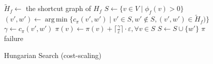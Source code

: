 \documentclass[11pt]{article}
\def\eps{\varepsilon}
\DeclareMathOperator*{\argmin}{arg\,min}
\def\fsupply{\phi}
\theoremstyle{plain}
\numberwithin{figure}{section}
\begin{document}
\begin{figure*}
\centering
\begin{minipage}{.8\linewidth}
\begin{algorithm}[H]
\caption{Hungarian Search (cost-scaling)}
\begin{algorithmic}[1]
	\State $\tilde{H}_f \gets$ the shortcut graph of $H_f$
	\State $S \gets \{v \in V \mid \fsupply_f(v) > 0\}$
	\Repeat
		\State $(v', w') \gets \argmin\{c_\pi(v', w') \mid v' \in S, w' \not\in S, (v', w') \in \tilde{H}_f)\}$
			\label{line:hs_relaxation}
		\State $\gamma \gets c_\pi(v', w')$
			\State $\pi(v) \gets \pi(v) + \lceil\frac{\gamma}{\eps}\rceil\cdot \eps, \forall v \in S$
		\EndIf
		\State $S \gets S \cup \{w'\}$
		\If{$\fsupply_f(w') < 0$} 
			\State\Return $\pi$
		\EndIf
	\State\Return failure
\EndFunction
\end{algorithmic}
\end{algorithm}
\end{minipage}
\end{figure*}
\end{document}
